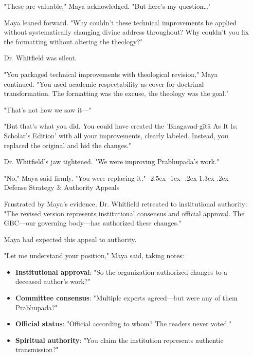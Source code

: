 \documentclass[12pt,twoside]{book}
\makeatletter
\renewcommand\section{\@startsection{section}{1}{\z@}%
{-2.5ex \@plus -1ex \@minus -.2ex}%
{1.3ex \@plus.2ex}%
{\normalfont\Large\bfseries}}
\makeatother
\begin{document}
"These are valuable," Maya acknowledged. "But here's my question\ldots{}"

Maya leaned forward. "Why couldn't these technical improvements be applied without systematically changing divine address throughout? Why couldn't you fix the formatting without altering the theology?"

Dr. Whitfield was silent.

"You packaged technical improvements with theological revision," Maya continued. "You used academic respectability as cover for doctrinal transformation. The formatting was the excuse, the theology was the goal."

"That's not how we saw it—"

"But that's what you did. You could have created the 'Bhagavad-gītā As It Is: Scholar's Edition' with all your improvements, clearly labeled. Instead, you replaced the original and hid the changes."

Dr. Whitfield's jaw tightened. "We were improving Prabhupāda's work."

"No," Maya said firmly. "You were replacing it."
\section{Defense Strategy 3: Authority Appeals}
\label{sec:orgdf9bc87}

Frustrated by Maya's evidence, Dr. Whitfield retreated to institutional authority: "The revised version represents institutional consensus and official approval. The GBC—our governing body—has authorized these changes."

Maya had expected this appeal to authority.

"Let me understand your position," Maya said, taking notes:

\begin{itemize}
\item \textbf{\textbf{Institutional approval}}: "So the organization authorized changes to a deceased author's work?"
\item \textbf{\textbf{Committee consensus}}: "Multiple experts agreed—but were any of them Prabhupāda?"
\item \textbf{\textbf{Official status}}: "Official according to whom? The readers never voted."
\item \textbf{\textbf{Spiritual authority}}: "You claim the institution represents authentic transmission?"
\end{itemize}
\end{document}
